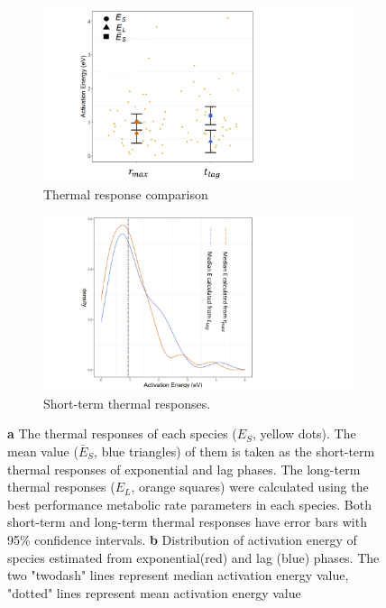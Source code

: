 \begin{figure}[htb]
\begin{subfigure}{.47\textwidth}
  \centering
  \includegraphics[width=1.5\linewidth]{Plot/E_comperasion.pdf}
  \caption{Thermal response comparison}
  \label{fig:E_comperasion}
\end{subfigure}%
\begin{subfigure}{.37\textwidth}
  \centering
  \includegraphics[angle=90, width=.99\linewidth]{Plot/E_hist.pdf}
  \caption{Short-term thermal responses.
  }
  \label{fig:E_hist}
\end{subfigure}
\caption{\textbf{a} The thermal responses of each species ($E_S$, yellow dots). The mean value ($\bar{E}_{S}$, blue triangles) of them is taken as the short-term thermal responses of exponential and lag phases. The long-term thermal responses ($E_L$, orange squares) were calculated using the best performance metabolic rate parameters in each species. Both short-term and long-term thermal responses have error bars with 95\% confidence intervals.
\textbf{b} Distribution of activation energy of species estimated from exponential(red) and lag (blue) phases. The two "twodash" lines represent median activation energy value, "dotted" lines represent mean activation energy value}
\label{fig:E_comp}
\end{figure}